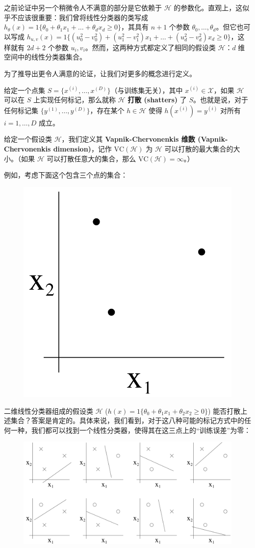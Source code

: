 之前论证中另一个稍微令人不满意的部分是它依赖于 $\mathcal{H}$ 的参数化。直观上，这似乎不应该很重要：我们曾将线性分类器的类写成 $h_\theta(x) = {1}\{\theta_0 + \theta_1 x_1 + \dots + \theta_d x_d \geq 0\}$，其具有 $n+1$ 个参数 $\theta_0, \dots, \theta_d$。但它也可以写成 $h_{u,v}(x) = {1}\{(u_0^2 - v_0^2) + (u_1^2 - v_1^2)x_1 + \dots + (u_d^2 - v_d^2)x_d \geq 0\}$，这样就有 $2d+2$ 个参数 $u_i, v_i$。然而，这两种方式都定义了相同的假设类 $\mathcal{H}$：$d$ 维空间中的线性分类器集合。

为了推导出更令人满意的论证，让我们对更多的概念进行定义。

给定一个点集 $S = \{x^{(i)}, \dots, x^{(D)}\}$（与训练集无关），其中 $x^{(i)} \in \mathcal{X}$，如果 $\mathcal{H}$ 可以在 $S$ 上实现任何标记，那么就称 $\mathcal{H}$ \textbf{打散 (shatters)} 了 $S$。也就是说，对于任何标记集 $\{y^{(1)}, \dots, y^{(D)}\}$，存在某个 $h \in \mathcal{H}$ 使得 $h(x^{(i)}) = y^{(i)}$ 对所有 $i = 1, \dots, D$ 成立。

给定一个假设类 $\mathcal{H}$，我们定义其 \textbf{Vapnik-Chervonenkis 维数 (Vapnik-Chervonenkis dimension)}，记作 $\text{VC}(\mathcal{H})$ 为 $\mathcal{H}$ 可以打散的最大集合的大小。（如果 $\mathcal{H}$ 可以打散任意大的集合，那么 $\text{VC}(\mathcal{H}) = \infty$。）

例如，考虑下面这个包含三个点的集合：

\begin{figure}[H]
    \centering
    \includegraphics[width=0.4\linewidth]{figs/three_points.png}
\end{figure}

二维线性分类器组成的假设类 $\mathcal{H}$ ($h(x) = {1}\{\theta_0 + \theta_1 x_1 + \theta_2 x_2 \geq 0\}$) 能否打散上述集合？答案是肯定的。具体来说，我们看到，对于这八种可能的标记方式中的任何一种，我们都可以找到一个线性分类器，使得其在这三点上的“训练误差”为零：

\begin{figure}[H]
    \centering
    \includegraphics[width=0.9\linewidth]{figs/three_points_shatter.png}
\end{figure}

